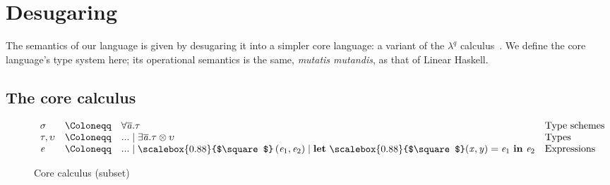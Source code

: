 \documentclass[acmsmall,usenames,dvipsnames,natbib=false,acmthm=false,screen]{acmart}
\newcommand{\keyword}[1]{\mathbf{#1}}
\newcommand{\klet}{\keyword{let}}
\newcommand{\packbox}{\raisebox{-0.08ex}{\scalebox{0.88}{$\square$}}}
\newcommand{\kin}{\keyword{in}}
\newcommand{\bnfeq}{\mathrel{\Coloneqq}}
\newcommand{\bnfor}{\mathrel{\mid}}
\theoremstyle{acmplain}
\theoremstyle{acmdefinition}
\begin{document}
\section{Desugaring}
\label{sec:desugaring}

The semantics of our language is given by desugaring it into
a simpler core language: a variant of the $λ^q$
calculus~\cite{LinearHaskell}. We
define the core language's type system here; its operational semantics
is the same, \emph{mutatis mutandis}, as that of Linear Haskell.

\subsection{The core calculus}
\label{sec:core-calculus}
\label{sec:ds:inferred-constraints}

\begin{figure}
  \maybesmall
  \centering
  $$
  \begin{array}{lcll}
     \sigma  & \bnfeq &   \forall   \overline{\ottmv{a} } .  \tau   & \text{Type schemes} \\
     \tau ,  \upsilon  & \bnfeq & ... \bnfor   \exists   \overline{\ottmv{a} } .  \tau  \otimes  \upsilon   & \text{Types} \\
     \ottnt{e}  & \bnfeq & ... \bnfor  \packbox \, \ottsym{(}  \ottnt{e_{{\mathrm{1}}}}  \ottsym{,}  \ottnt{e_{{\mathrm{2}}}}  \ottsym{)}  \bnfor   \klet\ \packbox (  \ottmv{x}  ,  \ottmv{y}  ) =  \ottnt{e_{{\mathrm{1}}}}  \ \kin \  \ottnt{e_{{\mathrm{2}}}}   & \text{Expressions}
  \end{array}
  $$

  \caption{Core calculus (subset)}
  \label{fig:core-typing-rules}\label{fig:core-grammar}
\end{figure}
\end{document}
